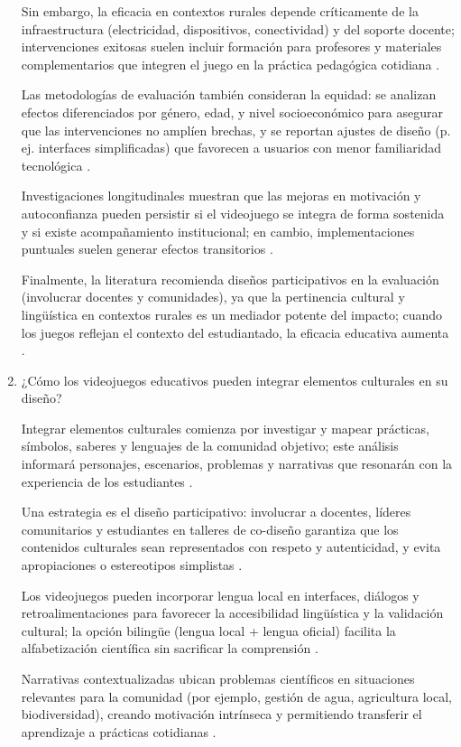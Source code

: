 \begin{enumerate}
    Sin embargo, la eficacia en contextos rurales depende críticamente de la infraestructura (electricidad, dispositivos, conectividad) y del soporte docente; intervenciones exitosas suelen incluir formación para profesores y materiales complementarios que integren el juego en la práctica pedagógica cotidiana \cite{}.

    Las metodologías de evaluación también consideran la equidad: se analizan efectos diferenciados por género, edad, y nivel socioeconómico para asegurar que las intervenciones no amplíen brechas, y se reportan ajustes de diseño (p. ej. interfaces simplificadas) que favorecen a usuarios con menor familiaridad tecnológica \cite{}.

    Investigaciones longitudinales muestran que las mejoras en motivación y autoconfianza pueden persistir si el videojuego se integra de forma sostenida y si existe acompañamiento institucional; en cambio, implementaciones puntuales suelen generar efectos transitorios \cite{}.

    Finalmente, la literatura recomienda diseños participativos en la evaluación (involucrar docentes y comunidades), ya que la pertinencia cultural y lingüística en contextos rurales es un mediador potente del impacto; cuando los juegos reflejan el contexto del estudiantado, la eficacia educativa aumenta \cite{}.

    \item ¿Cómo los videojuegos educativos pueden integrar elementos culturales en su diseño?
    
    Integrar elementos culturales comienza por investigar y mapear prácticas, símbolos, saberes y lenguajes de la comunidad objetivo; este análisis informará personajes, escenarios, problemas y narrativas que resonarán con la experiencia de los estudiantes \cite{}.

    Una estrategia es el diseño participativo: involucrar a docentes, líderes comunitarios y estudiantes en talleres de co-diseño garantiza que los contenidos culturales sean representados con respeto y autenticidad, y evita apropiaciones o estereotipos simplistas \cite{}.

    Los videojuegos pueden incorporar lengua local en interfaces, diálogos y retroalimentaciones para favorecer la accesibilidad lingüística y la validación cultural; la opción bilingüe (lengua local + lengua oficial) facilita la alfabetización científica sin sacrificar la comprensión \cite{}.

    Narrativas contextualizadas ubican problemas científicos en situaciones relevantes para la comunidad (por ejemplo, gestión de agua, agricultura local, biodiversidad), creando motivación intrínseca y permitiendo transferir el aprendizaje a prácticas cotidianas \cite{}.


\end{enumerate}

